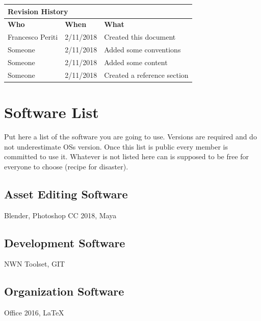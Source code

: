 \documentclass[12pt]{article}
\begin{document}
\begin{center}
\begin{table}[]
\begin{tabular}{lll}
\hline
\multicolumn{3}{|l|}{\cellcolor{gray}\textbf{Revision History}}\\ \hline
\multicolumn{1}{|l|}{\cellcolor{gray}\textbf{Who}} & \multicolumn{1}{l|}{\cellcolor{gray}\textbf{When}} & \multicolumn{1}{l|}{\cellcolor{gray}\textbf{What}}\\ \hline
\multicolumn{1}{|l|}{Francesco Periti} & \multicolumn{1}{l|}{2/11/2018} & \multicolumn{1}{l|}{Created this document}\\ \hline
\multicolumn{1}{|l|}{Someone} & \multicolumn{1}{l|}{2/11/2018} & \multicolumn{1}{l|}{Added some conventions}\\ \hline
\multicolumn{1}{|l|}{Someone} & \multicolumn{1}{l|}{2/11/2018} & \multicolumn{1}{l|}{Added some content}\\ \hline
\multicolumn{1}{|l|}{Someone} & \multicolumn{1}{l|}{2/11/2018} & \multicolumn{1}{l|}{Created a reference section}\\ \hline
\end{tabular}
\end{table}

\end{center}

\clearpage

\section{Software List}
Put here a list of the software you are going to use. Versions are required and do not underestimate OSs version.
Once this list is public every member is committed to use it.
Whatever is not listed here can is supposed to be free for everyone to choose (recipe for disaster).

\subsection{Asset Editing Software}
Blender, Photoshop CC 2018, Maya

\subsection{Development Software}
NWN Toolset, GIT

\subsection{Organization Software}
Office 2016, LaTeX
\end{document}
